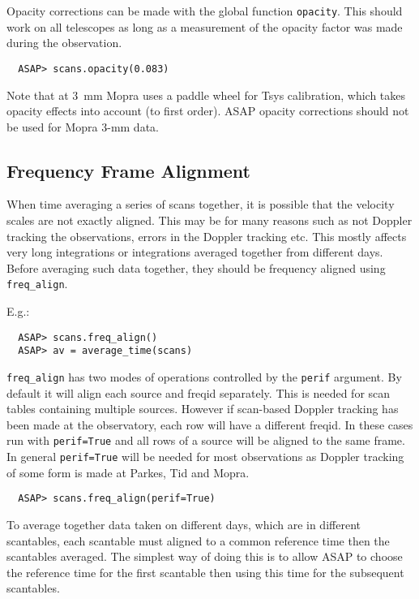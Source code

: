 \documentclass[11pt]{article}
\newcommand{\cmd}[1]{{\tt #1}}
\begin{document}
Opacity corrections can be made with the global
function \cmd{opacity}. This should work on all telescopes as long as
a measurement of the opacity factor was made during the observation.

\begin{verbatim}
  ASAP> scans.opacity(0.083)
\end{verbatim}

Note that at 3~mm Mopra uses a paddle wheel for Tsys calibration,
which takes opacity effects into account (to first order). ASAP
opacity corrections should not be used for Mopra 3-mm data.

\subsection{Frequency Frame Alignment}
\label{sec:freqalign}

When time
averaging a series of scans together, it is possible that the velocity
scales are not exactly aligned.  This may be for many reasons such as
not Doppler tracking the observations, errors in the Doppler tracking
etc.  This mostly affects very long integrations or integrations
averaged together from different days.  Before averaging such data
together, they should be frequency aligned using \cmd{freq\_align}.

E.g.:

\begin{verbatim}
  ASAP> scans.freq_align()
  ASAP> av = average_time(scans)
\end{verbatim}

\cmd{freq\_align} has two modes of operations controlled by the
\cmd{perif} argument. By default it will align each source and freqid
separately. This is needed for scan tables containing multiple
sources. However if scan-based Doppler tracking has been made at the
observatory, each row will have a different freqid. In these cases run
with \cmd{perif=True} and all rows of a source will be aligned to the
same frame. In general \cmd{perif=True} will be needed for most
observations as Doppler tracking of some form is made at Parkes, Tid
and Mopra.

\begin{verbatim}
  ASAP> scans.freq_align(perif=True)
\end{verbatim}

To average together data taken on different days, which are in
different scantables, each scantable must aligned to a common
reference time then the scantables averaged. The simplest way of
doing this is to allow ASAP to choose the reference time for the first
scantable then using this time for the subsequent scantables.
\end{document}
